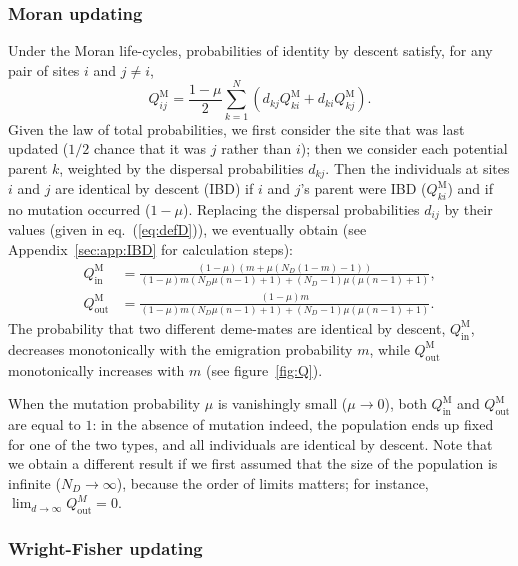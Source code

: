 \documentclass[11pt, letterpaper]{article}
\renewcommand{\eqref}[1]{\textup{{\normalfont eq.~(\ref{#1}}\normalfont)}}
\newcommand{\appname}[0]{Appendix}
\newcommand{\Moran}{\textrm{M}}
\newcommand{\inn}{\textrm{in}}
\newcommand{\out}{\textrm{out}}
\newcommand{\Qin}{Q_{\inn}}
\newcommand{\Qout}{Q_{\out}}
\newcommand{\ndemes}{N_D}
\begin{document}
\subsubsection{Moran updating} 

Under the Moran life-cycles, probabilities of identity by descent satisfy, for any pair of sites $i$ and $j\neq i$,
\begin{equation}
Q_{ij}^{\Moran} = \frac{1-\mu}{2} \sum_{k=1}^N \left(d_{kj} Q_{ki}^{\Moran} + d_{ki} Q_{kj}^{\Moran}\right).
\end{equation}
%
Given the law of total probabilities, we first consider the site that was last updated ($1/2$ chance that it was $j$ rather than $i$); then we consider each potential parent $k$, weighted by the dispersal probabilities $d_{kj}$. Then the individuals at sites $i$ and $j$ are identical by descent (IBD) if $i$ and $j$'s parent were IBD ($Q_{ki}^{\Moran}$) and if no mutation occurred ($1-\mu$).  Replacing the dispersal probabilities $d_{ij}$ by their values (given in \eqref{eq:defD}), we eventually obtain (see \appname~\ref{sec:app:IBD} for calculation steps):
\begin{subequations}\label{eq:QM}
\begin{align}
\Qin^{\Moran} &= \frac{(1-\mu ) \left(m + \mu  (\ndemes (1-m)-1)\right)}{(1-\mu ) m (\ndemes \mu  (n-1)+1)+(\ndemes-1) \mu  (\mu  (n-1)+1)},\\
%
%
\Qout^{\Moran} & = \frac{(1-\mu ) m}{(1-\mu ) m (\ndemes \mu  (n-1)+1)+(\ndemes-1) \mu  (\mu  (n-1)+1)}.
\end{align}
\end{subequations}
%
The probability that two different deme-mates are identical by descent, $\Qin^{\Moran}$, decreases monotonically with the emigration probability $m$, while  $\Qout^{\Moran}$ monotonically increases with $m$ (see figure~\ref{fig:Q}). 

When the mutation probability $\mu$ is vanishingly small ($\mu \to 0$), both $\Qin^{\Moran}$ and $\Qout^{\Moran}$ are equal to $1$: in the absence of mutation indeed, the population ends up fixed for one of the two types, and all individuals are identical by descent. Note that we obtain a different result if we first assumed that the size of the population is infinite ($\ndemes \to \infty$), because the order of limits matters; %
for instance, $\lim_{d\to \infty} \Qout^{M}=0$. 


\subsubsection{Wright-Fisher updating}
\end{document}
